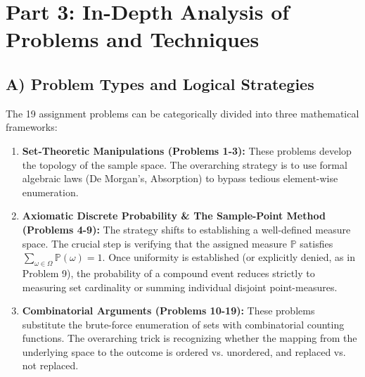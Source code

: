 \documentclass[11pt, letterpaper]{article}
\theoremstyle{definition}
\theoremstyle{remark}
\newcommand{\Prob}{\mathbb{P}}
\begin{document}
\newpage
\section{Part 3: In-Depth Analysis of Problems and Techniques}

\subsection{A) Problem Types and Logical Strategies}
The 19 assignment problems can be categorically divided into three mathematical frameworks:
\begin{enumerate}
    \item \textbf{Set-Theoretic Manipulations (Problems 1-3):} These problems develop the topology of the sample space. The overarching strategy is to use formal algebraic laws (De Morgan's, Absorption) to bypass tedious element-wise enumeration. 
    \item \textbf{Axiomatic Discrete Probability \& The Sample-Point Method (Problems 4-9):} The strategy shifts to establishing a well-defined measure space. The crucial step is verifying that the assigned measure $\Prob$ satisfies $\sum_{\omega \in \Omega} \Prob(\omega) = 1$. Once uniformity is established (or explicitly denied, as in Problem 9), the probability of a compound event reduces strictly to measuring set cardinality or summing individual disjoint point-measures.
    \item \textbf{Combinatorial Arguments (Problems 10-19):} These problems substitute the brute-force enumeration of sets with combinatorial counting functions. The overarching trick is recognizing whether the mapping from the underlying space to the outcome is ordered vs. unordered, and replaced vs. not replaced.
\end{enumerate}
\end{document}
